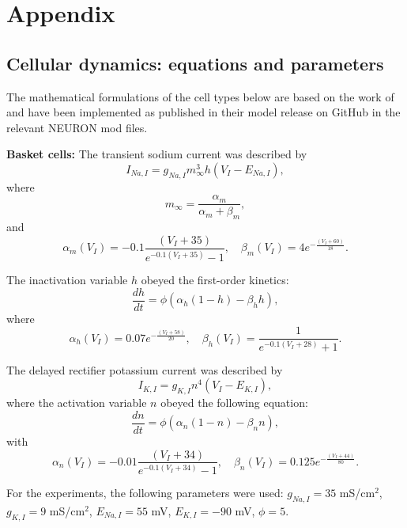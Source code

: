 \chapter{Appendix}\label{ch:appendix_a}
\section{Cellular dynamics: equations and parameters}
The mathematical formulations of the cell types below are based on the work of
\textcite{sanjayImpairedDendriticInhibition2015} and have been implemented as
published in their model release on GitHub in the relevant NEURON mod files.

\noindent
\textbf{Basket cells:} The transient sodium current was described by
\[
    I_{Na,I} = g_{Na,I} m_{\infty}^3 h (V_I - E_{Na,I}),
\]
where
\[
    m_{\infty} = \frac{\alpha_m}{\alpha_m + \beta_m},
\]
and
\[
    \alpha_m(V_I) = -0.1 \frac{(V_I + 35)}{e^{-0.1(V_I+35)} - 1}, \quad \beta_m(V_I) = 4e^{-\frac{(V_I+60)}{18}}.
\]

The inactivation variable \( h \) obeyed the first-order kinetics:
\[
    \frac{dh}{dt} = \phi(\alpha_h (1 - h) - \beta_h h),
\]
where
\[
    \alpha_h(V_I) = 0.07 e^{-\frac{(V_I+58)}{20}}, \quad \beta_h(V_I) = \frac{1}{e^{- 0.1(V_I+28)} + 1}.
\]

The delayed rectifier potassium current was described by
\[
    I_{K,I} = g_{K,I} n^4 (V_I - E_{K,I}),
\]
where the activation variable \( n \) obeyed the following equation:
\[
    \frac{dn}{dt} = \phi(\alpha_n (1 - n) - \beta_n n),
\]
with
\[
    \alpha_n(V_I) = -0.01 \frac{(V_I + 34)}{e^{-0.1(V_I+34)} - 1}, \quad \beta_n(V_I) = 0.125 e^{-\frac{(V_I+44)}{80}}.
\]

For the experiments, the following parameters were used: \( g_{Na,I} = 35 \)
mS/cm\(^2\), \( g_{K,I} = 9 \) mS/cm\(^2\), \( E_{Na,I} = 55 \) mV, \( E_{K,I}
= -90 \) mV, \( \phi = 5 \).\pagebreak

